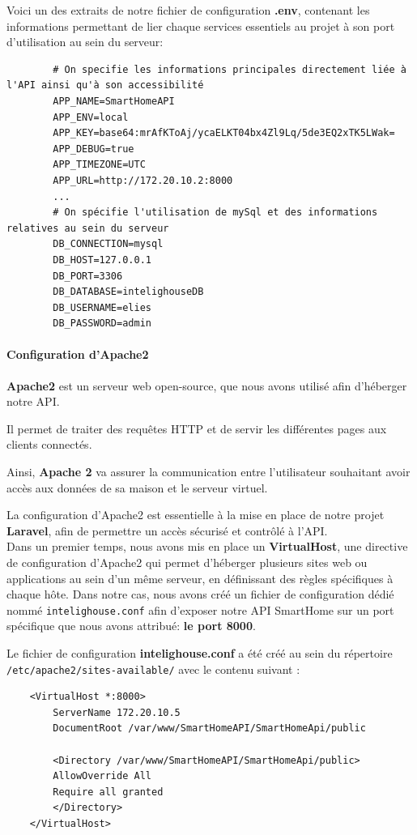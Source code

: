 \documentclass[10pt, a4paper]{report}
\begin{document}
	Voici un des extraits de notre fichier de configuration \textbf{.env}, contenant les informations permettant de lier chaque services essentiels au projet à son port d'utilisation au sein du serveur:
	
	\begin{lstlisting}
		# On specifie les informations principales directement liée à l'API ainsi qu'à son accessibilité
		APP_NAME=SmartHomeAPI
		APP_ENV=local
		APP_KEY=base64:mrAfKToAj/ycaELKT04bx4Zl9Lq/5de3EQ2xTK5LWak=
		APP_DEBUG=true
		APP_TIMEZONE=UTC
		APP_URL=http://172.20.10.2:8000
		...
		# On spécifie l'utilisation de mySql et des informations relatives au sein du serveur
		DB_CONNECTION=mysql
		DB_HOST=127.0.0.1
		DB_PORT=3306
		DB_DATABASE=intelighouseDB
		DB_USERNAME=elies
		DB_PASSWORD=admin
	\end{lstlisting}
	\paragraph{Configuration d'Apache2\\}
	\textbf{Apache2} est un serveur web open-source, que nous avons utilisé afin d'héberger notre API.
	
	Il permet de traiter des requêtes HTTP et de servir les différentes pages aux clients connectés.
	
	Ainsi, \textbf{Apache 2} va assurer la communication entre l'utilisateur souhaitant avoir accès aux données de sa maison et le serveur virtuel.
	
	La configuration d'Apache2 est essentielle à la mise en place de notre projet \textbf{Laravel}, afin de permettre un accès sécurisé et contrôlé à l'API.\\
	
	Dans un premier temps, nous avons mis en place un \textbf{VirtualHost}, une directive de configuration d’Apache2 qui permet d’héberger plusieurs sites web ou applications au sein d'un même serveur, en définissant des règles spécifiques à chaque hôte. Dans notre cas, nous avons créé un fichier de configuration dédié nommé \texttt{intelighouse.conf} afin d’exposer notre API SmartHome sur un port spécifique que nous avons attribué: \textbf{le port 8000}.
	
	Le fichier de configuration \textbf{intelighouse.conf} a été créé au sein du répertoire \texttt{/etc/apache2/sites-available/} avec le contenu suivant :
	
	\begin{lstlisting}
	<VirtualHost *:8000>
		ServerName 172.20.10.5
		DocumentRoot /var/www/SmartHomeAPI/SmartHomeApi/public
		
		<Directory /var/www/SmartHomeAPI/SmartHomeApi/public>
		AllowOverride All
		Require all granted
		</Directory>
	</VirtualHost>
	\end{lstlisting}
	
\end{document}

